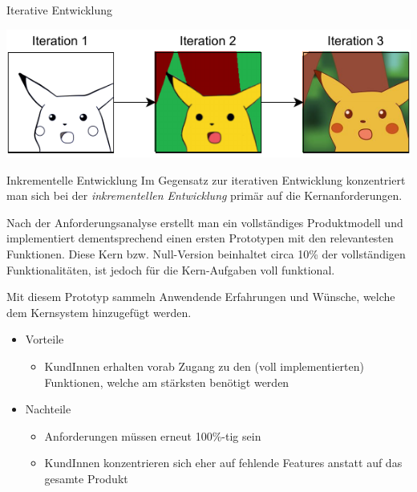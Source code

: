 \begin{example}{Iterative Entwicklung}
    \begin{center}
        \includegraphics{includes/figures/01_iterative_development_example.pdf}
    \end{center}
\end{example}

\begin{defi}{Inkrementelle Entwicklung}
    Im Gegensatz zur iterativen Entwicklung konzentriert man sich bei der \emph{inkrementellen Entwicklung} primär auf die Kernanforderungen.

    Nach der Anforderungsanalyse erstellt man ein vollständiges Produktmodell und implementiert dementsprechend einen ersten Prototypen mit den relevantesten Funktionen.
    Diese Kern bzw. Null-Version beinhaltet circa 10\% der vollständigen Funktionalitäten, ist jedoch für die Kern-Aufgaben voll funktional.

    Mit diesem Prototyp sammeln Anwendende Erfahrungen und Wünsche, welche dem Kernsystem hinzugefügt werden.

    \begin{itemize}
        \item Vorteile
              \begin{itemize}
                  \item KundInnen erhalten vorab Zugang zu den (voll implementierten) Funktionen, welche am stärksten benötigt werden
              \end{itemize}
        \item Nachteile
              \begin{itemize}
                  \item Anforderungen müssen erneut 100\%-tig sein
                  \item KundInnen konzentrieren sich eher auf fehlende Features anstatt auf das gesamte Produkt
              \end{itemize}
    \end{itemize}
\end{defi}

